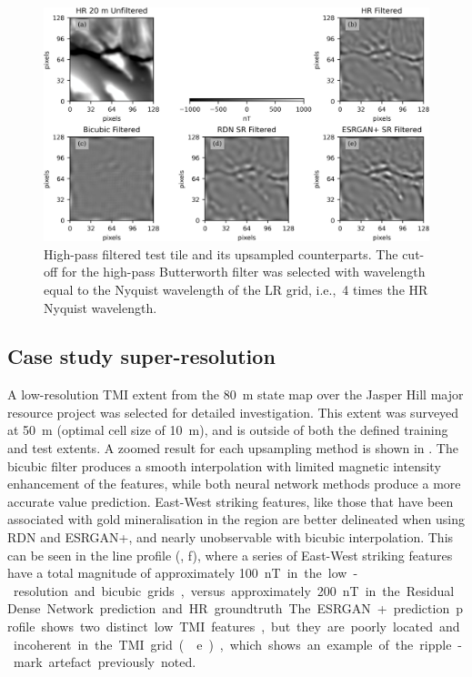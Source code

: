 \begin{landscape}
    \begin{figure}[hbtp]
        \centering
        \includegraphics[width=\linewidth,trim={0 0 0 -5mm},clip]{fig/p1/hpfilt.jpg}
        \caption[High-pass filtered results]{High-pass filtered test tile and its upsampled counterparts.
            The cut-off for the high-pass Butterworth filter was selected with wavelength equal to the Nyquist wavelength of the LR grid, i.e.,\ 4 times the HR Nyquist wavelength.
        }
        \label{fig:filtered}
    \end{figure}
\end{landscape}

\subsection{Case study super-resolution}
A low-resolution TMI extent from the \qty{80}{\metre} state map over the Jasper Hill major resource project was selected for detailed investigation.
This extent was surveyed at \qty{50}{\metre} (optimal cell size of \qty{10}{\metre}), and is outside of both the defined training and test extents.
A zoomed result for each upsampling method is shown in .
The bicubic filter produces a smooth interpolation with limited magnetic intensity enhancement of the features, while both neural network methods produce a more accurate value prediction.
East-West striking features, like those that have been associated with gold mineralisation in the region \parencite[p.~283]{salierTimingSourceGoldbearing2003} are better delineated when using RDN\textdaggerdbl{} and ESRGAN+, and nearly unobservable with bicubic interpolation.
This can be seen in the line profile (, f), where a series of East-West striking features have a total magnitude of approximately \qty{100}nT in the low-resolution and bicubic grids, versus approximately \qty{200}nT in the Residual Dense Network prediction and HR groundtruth.
The ESRGAN+ prediction profile shows two distinct low TMI features, but they are poorly located and incoherent in the TMI grid ( e), which shows an example of the ripple-mark artefact previously noted.

